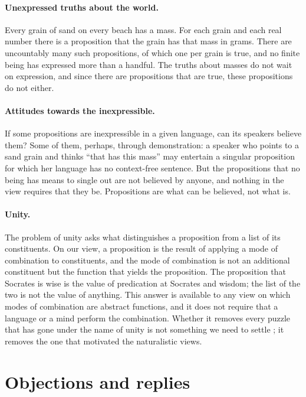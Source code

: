 \documentclass{situationist-preprint}
\begin{document}
\paragraph{Unexpressed truths about the world.} Every grain of sand on every beach has a mass. For each grain and each real number there is a proposition that the grain has that mass in grams. There are uncountably many such propositions, of which one per grain is true, and no finite being has expressed more than a handful. The truths about masses do not wait on expression, and since there are propositions that are true, these propositions do not either.

\paragraph{Attitudes towards the inexpressible.} If some propositions are inexpressible in a given language, can its speakers believe them? Some of them, perhaps, through demonstration: a speaker who points to a sand grain and thinks \enquote{that has this mass} may entertain a singular proposition for which her language has no context-free sentence. But the propositions that no being has means to single out are not believed by anyone, and nothing in the view requires that they be. Propositions are what can be believed, not what is.

\paragraph{Unity.} The problem of unity asks what distinguishes a proposition from a list of its constituents. On our view, a proposition is the result of applying a mode of combination to constituents, and the mode of combination is not an additional constituent but the function that yields the proposition. The proposition that Socrates is wise is the value of predication at Socrates and wisdom; the list of the two is not the value of anything. This answer is available to any view on which modes of combination are abstract functions, and it does not require that a language or a mind perform the combination. Whether it removes every puzzle that has gone under the name of unity is not something we need to settle \citep{Gaskin2008}; it removes the one that motivated the naturalistic views.

\section{Objections and replies}\label{s:obj}
\end{document}
